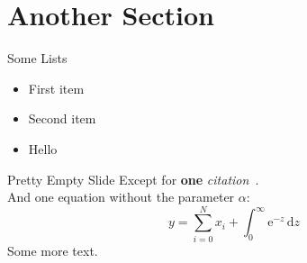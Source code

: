 \section{Another Section}
\begin{frame}{Some Lists}
\begin{itemize}
    \item<+-> First item
    \item<+-> Second item
    \item<+- | alert@3> Hello
\end{itemize}
    
\end{frame}

\begin{frame}{Pretty Empty Slide}
Except for \textbf{one} \textit{citation}~\cite{anonymous2021}.\\
And one equation without the parameter $\alpha$:
\begin{equation}
    y = \sum_{i=0}^{N}x_i + \int_0^\infty \mathrm{e}^{-z}\,\mathrm{d}z
\end{equation}
Some more text.
\end{frame}


